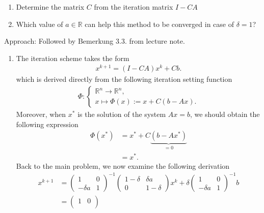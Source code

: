\documentclass[12pt]{article}
\begin{document}
\begin{enumerate}
	\item Determine the matrix $C$ from the iteration matrix $I-CA$
	\item Which value of $a \in \mathbb{R}$ can help this method to be converged
	      in case of $\delta=1$?
\end{enumerate}
Approach: Followed by Bemerkung 3.3. from lecture note.
\begin{enumerate}
	\item The iteration scheme takes the form
	      \begin{align*}
		      \boxed{
			      x^{k+1} = (I-CA) x^{k} + Cb.
		      }
	      \end{align*}
	      which is derived directly from the following iteration setting function 
	      \begin{align}
		      \Phi :
		      \begin{cases}
			      \mathbb{R}^n \rightarrow \mathbb{R}^n, \\
			      x \mapsto \Phi(x):= x + C(b-Ax).
		      \end{cases}
	      \end{align}
	      Moreover, when $x^{*}$ is the solution of the system $Ax=b$,
	      we should obtain the following expression
	      \begin{align*}
		      \Phi(x^{*})
		       & = x^{*} + C\underbrace{(b-Ax^{*})}_{=0} \\
		       & = x^{*}.
	      \end{align*}
	      Back to the main problem, we now examine the following derivation
	      \begin{align}
		      \label{eq:iterationphix}
		      x^{k+1} & =
		      \begin{pmatrix}
			      1         & 0 \\
			      -\delta a & 1
		      \end{pmatrix}^{-1}
		      \begin{pmatrix}
			      1-\delta & \delta a \\
			      0        & 1-\delta
		      \end{pmatrix}
		      x^{k}
		      + \delta \begin{pmatrix}
			      1         & 0 \\
			      -\delta a & 1
		      \end{pmatrix}^{-1}b \\
		              & =
		      \begin{pmatrix}
			      1        & 0 \\

\end{pmatrix}
\end{align}
\end{enumerate}
\end{document}
